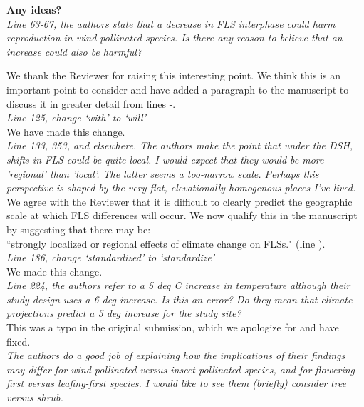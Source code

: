 \documentclass[11pt]{article}
\begin{document}
\textbf{Any ideas?}\\

\emph{Line 63-67, the authors state that a decrease in FLS interphase could harm reproduction in wind-pollinated species. Is there any reason to believe that an increase could also be harmful?}

\noindent We thank the Reviewer for raising this interesting point. We think this is an important point to consider and have added a paragraph to the manuscript to discuss it in greater detail from lines -. \\

\emph{Line 125, change `with' to `will'}\\

We have made this change.\\


\emph{Line 133, 353, and elsewhere. The authors make the point that under the DSH, shifts in FLS could be quite local. I would expect that they would be more 'regional' than 'local'. The latter seems a too-narrow scale. Perhaps this perspective is shaped by the very flat, elevationally homogenous places I've lived.}\\

We agree with the Reviewer that it is difficult to clearly predict the geographic scale at which FLS differences will occur. We now qualify this in the manuscript by suggesting that there may be:\\

``strongly localized or regional effects of climate change on FLSs." (line ).\\

\emph{Line 186, change `standardized' to `standardize'}\\

We made this change.\\


\emph{Line 224, the authors refer to a 5 deg C increase in temperature although their study design uses a 6 deg increase. Is this an error? Do they mean that climate projections predict a 5 deg increase for the study site?}\\

This was a typo in the original submission, which we apologize for and have fixed.\\

\emph{The authors do a good job of explaining how the implications of their findings may differ for wind-pollinated versus insect-pollinated species, and for flowering-first versus leafing-first species. I would like to see them (briefly) consider tree versus shrub.}\\
\end{document}
